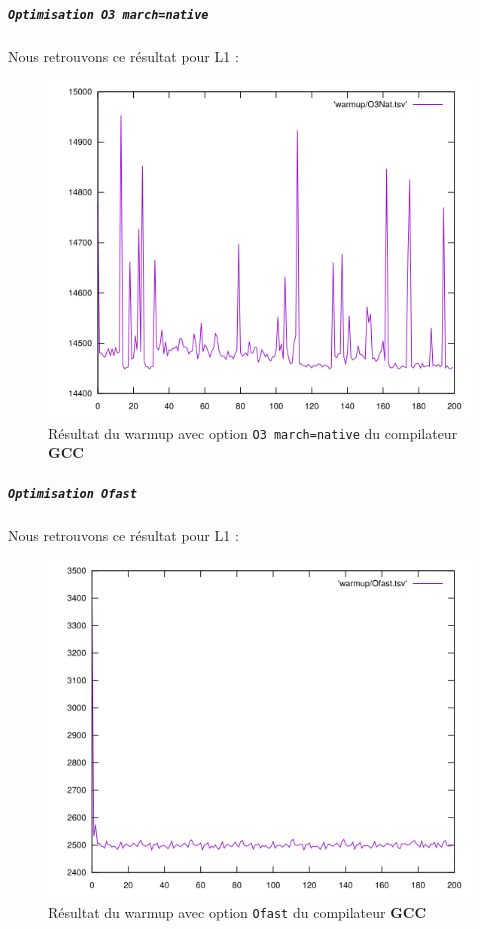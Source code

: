 \documentclass{report}
\begin{document}
    \newpage
\subparagraph{ \texttt{Optimisation O3 march=native}}
  Nous retrouvons ce résultat pour L1 :
  \begin{figure}[ht!]
    \centering
\includegraphics[scale=0.45]{resources/L1/warmup/O3Nat.png}
    \caption{Résultat du warmup avec option \texttt{O3 march=native} du compilateur \textbf{GCC}}
  \end{figure}
  \newpage
\subparagraph{ \texttt{Optimisation Ofast}}
Nous retrouvons ce résultat pour L1 :
\begin{figure}[ht!]
  \centering
\includegraphics[scale=0.45]{resources/L1/warmup/Ofast.png}
  \caption{Résultat du warmup avec option \texttt{Ofast} du compilateur \textbf{GCC}}
\end{figure}
\newpage
\end{document}
